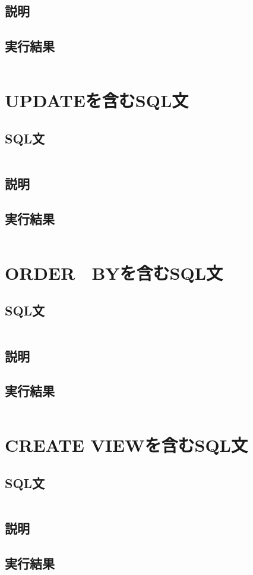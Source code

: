 \documentclass{jarticle}
\begin{document}
\subsection{説明}
\subsection{実行結果}
\begin{verbatim}
\end{verbatim}
\section{UPDATEを含むSQL文}
\subsection{SQL文}
\begin{verbatim}
\end{verbatim}
\subsection{説明}
\subsection{実行結果}
\begin{verbatim}
\end{verbatim}
\section{ORDER　BYを含むSQL文}
\subsection{SQL文}
\begin{verbatim}
\end{verbatim}
\subsection{説明}
\subsection{実行結果}
\begin{verbatim}
\end{verbatim}
\section{CREATE VIEWを含むSQL文}
\subsection{SQL文}
\begin{verbatim}
\end{verbatim}
\subsection{説明}
\subsection{実行結果}
\begin{verbatim}
\end{verbatim}
\end{document}
